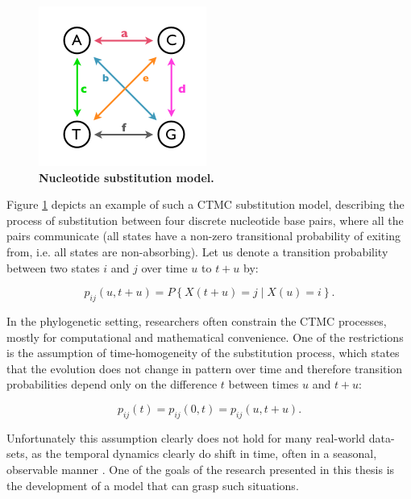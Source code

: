 \documentclass[12pt,twoside]{mitthesis}
\theoremstyle{plain}
\theoremstyle{definition}
\theoremstyle{remark}
\begin{document}
\begin{figure}[h]
\begin{center}
\includegraphics[scale=0.5]{substitution} 
\end{center}
\caption{{ \footnotesize {\bf  Nucleotide substitution model.} 
}}
\label{fig:substitution}
\end{figure}

Figure \ref{fig:substitution} depicts an example of such a CTMC substitution model, describing the process of substitution between four discrete nucleotide base pairs, where all the pairs communicate (all states have a non-zero transitional probability of exiting from, i.e. all states are non-absorbing).
Let us denote a transition probability between two states $i$ and $j$ over time $u$ to $t+u$ by:

\begin{equation}
p_{ij}\left(u,t+u\right)=P\left\{ X(t+u)=j\mid X(u)=i\right\} .
\end{equation}

In the phylogenetic setting, researchers often constrain the CTMC processes, mostly for computational and mathematical convenience.
One of the restrictions is the assumption of time-homogeneity of the substitution process, which states that the evolution does not change in pattern over time and therefore transition probabilities depend only on the difference $t$ between times $u$ and $t + u$:

\begin{equation}
p_{ij}\left(t\right) = p_{ij}\left(0,t\right) = p_{ij}\left(u,t+u\right).
\label{eq:time_homogeneity}
\end{equation}

Unfortunately this assumption clearly does not hold for many real-world data-sets, as the temporal dynamics clearly do shift in time, often in a seasonal, observable manner \citep{Bahl2011}.
One of the goals of the research presented in this thesis is the development of a model that can grasp such situations.
\end{document}
